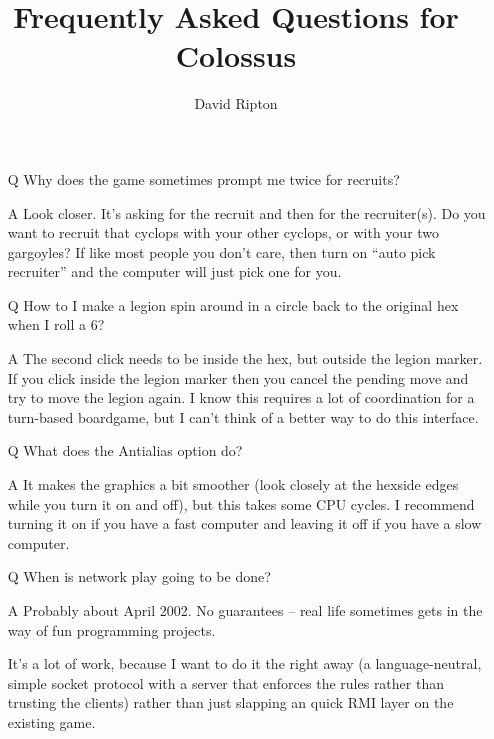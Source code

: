 \documentclass{article}
\begin{document}

\title{Frequently Asked Questions for Colossus}

\author{David Ripton}

\maketitle

\begin{itemize}

\item[Q] Why does the game sometimes prompt me twice for recruits?

\item[A] Look closer. It's asking for the recruit and then for the recruiter(s).
 Do you want to recruit that cyclops with your other cyclops, or with
 your two gargoyles? If like most people you don't care, then turn on 
 ``auto pick recruiter'' and the computer will just pick one for you.


\item[Q] How to I make a legion spin around in a circle back to the original
 hex when I roll a 6? 

\item[A] The second click needs to be inside the hex, but outside the legion 
 marker. If you click inside the legion marker then you cancel the
 pending move and try to move the legion again. I know this requires
 a lot of coordination for a turn-based boardgame, but I can't think
 of a better way to do this interface.


\item[Q] What does the Antialias option do?

\item[A] It makes the graphics a bit smoother (look closely at the hexside edges
 while you turn it on and off), but this takes some CPU cycles. I
 recommend turning it on if you have a fast computer and leaving it off
 if you have a slow computer. 


\item[Q] When is network play going to be done?

\item[A] Probably about April 2002. No guarantees -- real life sometimes
 gets in the way of fun programming projects.

 It's a lot of work, because I want to do it the right away (a 
 language-neutral, simple socket protocol with a server that enforces
 the rules rather than trusting the clients) rather than just slapping
 an quick RMI layer on the existing game.



\end{itemize}
\end{document}
